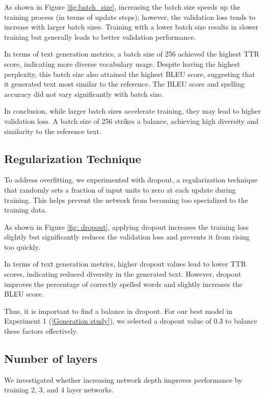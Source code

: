 \documentclass{article}
\begin{document}
As shown in Figure \ref{fig:batch_size}, increasing the batch size speeds up the training process (in terms of update steps); however, the validation loss tends to increase with larger batch sizes. Training with a lower batch size results in slower training but generally leads to better validation performance.

In terms of text generation metrics, a batch size of 256 achieved the highest TTR score, indicating more diverse vocabulary usage. Despite having the highest perplexity, this batch size also attained the highest BLEU score, suggesting that it generated text most similar to the reference. The BLEU score and spelling accuracy did not vary significantly with batch size.

In conclusion, while larger batch sizes accelerate training, they may lead to higher validation loss. A batch size of 256 strikes a balance, achieving high diversity and similarity to the reference text.

\subsection{Regularization Technique}

To address overfitting, we experimented with dropout, a regularization technique that randomly sets a fraction of input units to zero at each update during training. This helps prevent the network from becoming too specialized to the training data.

As shown in Figure \ref{fig: dropout}, applying dropout increases the training loss slightly but significantly reduces the validation loss and prevents it from rising too quickly.

In terms of text generation metrics, higher dropout values lead to lower TTR scores, indicating reduced diversity in the generated text. However, dropout improves the percentage of correctly spelled words and slightly increases the BLEU score.

Thus, it is important to find a balance in dropout. For our best model in Experiment 1 (\ref{Generation study}), we selected a dropout value of 0.3 to balance these factors effectively.

\subsection{Number of layers}

We investigated whether increasing network depth improves performance by training 2, 3, and 4 layer networks.
\end{document}
